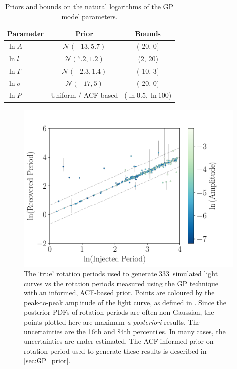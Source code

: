 \documentclass[a4paper,fleqn,usenatbib,useAMS]{mnras}
\newcommand{\naigrain}{333}
\begin{document}
\begin{table}
\begin{center}
\caption{\label{tab:priors} Priors and bounds on the natural logarithms of
    the GP model parameters.}
\begin{tabular}{lcc}
Parameter & Prior & Bounds\\
    \hline
    $\ln A$ & $\mathcal N(-13, 5.7)$ & (-20, 0) \\
    $\ln l$ & $\mathcal N(7.2, 1.2)$ & (2, 20) \\
    $\ln \Gamma$ & $\mathcal N(-2.3, 1.4)$ & (-10, 3) \\
    $\ln \sigma$ & $\mathcal N(-17, 5)$ & (-20, 0) \\
    $\ln P $ & Uniform / ACF-based & ($\ln 0.5, \ln 100$) \\
\end{tabular}
\end{center}
\end{table}

\begin{figure}
\begin{center}
\includegraphics[width=6in, clip=true]{figures/comparison_acfprior_03_10.pdf}
\caption{The `true' rotation periods used to generate \naigrain\
simulated light curves vs the rotation periods measured using the GP
technique with an informed, ACF-based prior.
    Points are coloured by the peak-to-peak amplitude of the light curve, as
    defined in \citet{Aigrain2015}.
Since the posterior PDFs of rotation periods are often non-Gaussian,
    the points plotted here are maximum {\it a-posteriori} results.
The uncertainties are the 16th and 84th percentiles.
In many cases, the uncertainties are under-estimated.
The ACF-informed prior on rotation period used to generate these results is
    described in \textsection \ref{sec:GP_prior}.
    }
\label{fig:compare_mcmc_acfprior}
\end{center}
\end{figure}
\end{document}
